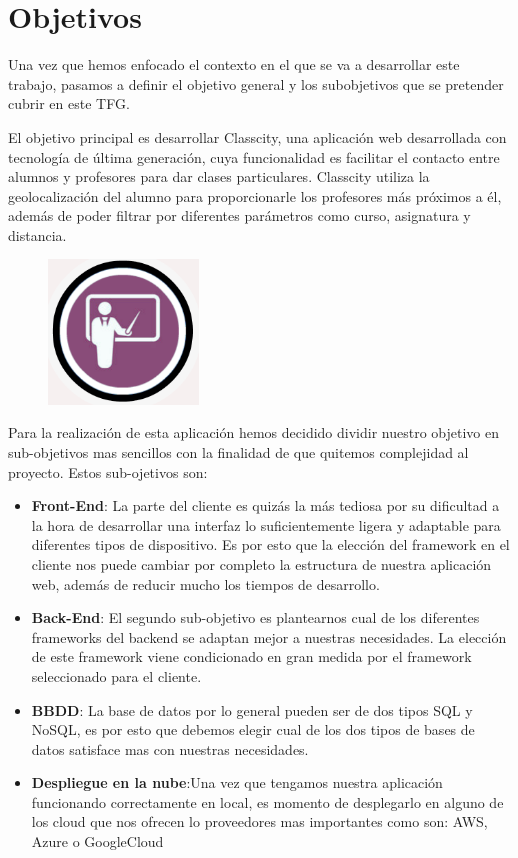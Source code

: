 \chapter{Objetivos}
Una vez que hemos enfocado el contexto en el que se va a desarrollar este trabajo, pasamos a definir el objetivo general y los subobjetivos que se pretender cubrir en este TFG.

El objetivo principal es desarrollar Classcity, una aplicación web desarrollada con tecnología de última  generación, cuya funcionalidad es facilitar el contacto entre alumnos y profesores para dar clases particulares. Classcity utiliza la geolocalización del alumno para proporcionarle los profesores más próximos a él, además de poder filtrar por diferentes parámetros como curso, asignatura y distancia.

\begin{figure}[H]
    \centering
    \includegraphics[width=40mm]{memoria/LaTeX/img/introduccion/logo.jpg}
\end{figure}

Para la realización de esta aplicación hemos decidido dividir nuestro objetivo en sub-objetivos mas sencillos con la finalidad de que quitemos complejidad al proyecto. Estos sub-ojetivos son:
\begin{itemize}

    \item \textbf {Front-End}: La parte del cliente es quizás la más tediosa por su dificultad a la hora de desarrollar una interfaz lo suficientemente ligera y adaptable para diferentes tipos de dispositivo. Es por esto que la elección del framework en el cliente nos puede cambiar por completo la estructura de nuestra aplicación web, además de reducir mucho los tiempos de desarrollo.

    \item \textbf {Back-End}: El segundo sub-objetivo es plantearnos cual de los diferentes frameworks del backend se adaptan mejor a nuestras necesidades. La elección de este framework viene condicionado en gran medida por el framework seleccionado para el cliente.  
    
    \item \textbf {BBDD}: La base de datos por lo general pueden ser de dos tipos SQL y NoSQL, es por esto que debemos elegir cual de los dos tipos de bases de datos satisface mas con nuestras necesidades.
    
    \item \textbf {Despliegue en la nube}:Una vez que tengamos nuestra aplicación funcionando correctamente en local, es momento de desplegarlo en alguno de los cloud que nos ofrecen lo proveedores mas importantes como son: AWS, Azure o GoogleCloud 
    

\end{itemize}
